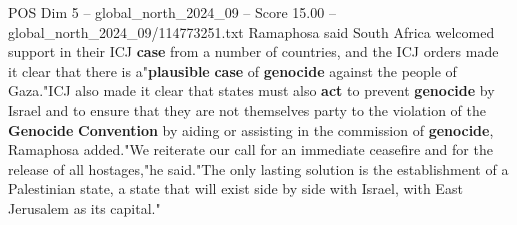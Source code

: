 \begin{textsample}{POS Dim 5 – global\_north\_2024\_09 – Score 15.00 – global\_north\_2024\_09/114773251.txt}
Ramaphosa said South Africa welcomed support in their ICJ \textbf{case} from a number of countries, and the ICJ orders made it clear that there is a"\textbf{plausible} \textbf{case} of \textbf{genocide} against the people of Gaza."ICJ also made it clear that states must also \textbf{act} to prevent \textbf{genocide} by Israel and to ensure that they are not themselves party to the violation of the \textbf{Genocide} \textbf{Convention} by aiding or assisting in the commission of \textbf{genocide}, Ramaphosa added."We reiterate our call for an immediate ceasefire and for the release of all hostages,"he said."The only lasting solution is the establishment of a Palestinian state, a state that will exist side by side with Israel, with East Jerusalem as its capital."

\end{textsample}
